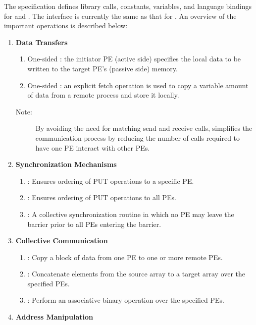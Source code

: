 The \openshmem{} specification defines library calls, constants, variables, and language bindings for \Clang{} and \Fortran{}.
The \Cpp{} interface is currently the same as that for \Clang. An overview of the important \openshmem{} operations is described below:

\begin{enumerate}
\item \textbf{Data Transfers }

\begin{enumerate}
\item One-sided  : the initiator \ac{PE} (active side) specifies the local
data to be written to the target \ac{PE}'s (passive side) memory. 
\item One-sided  : an explicit fetch operation is used to copy a variable
amount of data from a remote process and store it locally.\end{enumerate}
\begin{description}
\item [{{Note:}}] By avoiding the need for matching send and receive
calls, \openshmem simplifies the communication process by reducing the
number of calls required to have one \ac{PE} interact with other \ac{PE}s. 
\end{description}
\item \textbf{Synchronization Mechanisms }

\begin{enumerate}
\item {}: Ensures ordering of PUT operations to a specific \ac{PE}. 
\item {}: Ensures ordering of PUT operations to all \ac{PE}s. 
\item {}: A collective synchronization routine in which no \ac{PE} may leave
the barrier prior to all \ac{PE}s entering the barrier. 
\end{enumerate}
\item \textbf{Collective Communication}

\begin{enumerate}
\item {}: Copy a block of data from one \ac{PE} to one or more remote
PEs. 
\item {}: Concatenate elements from the source array to a target
array over the specified \ac{PE}s. 
\item {}: Perform an associative binary operation over the specified
\ac{PE}s. 
\end{enumerate}
\item \textbf{Address Manipulation}


\end{enumerate}

